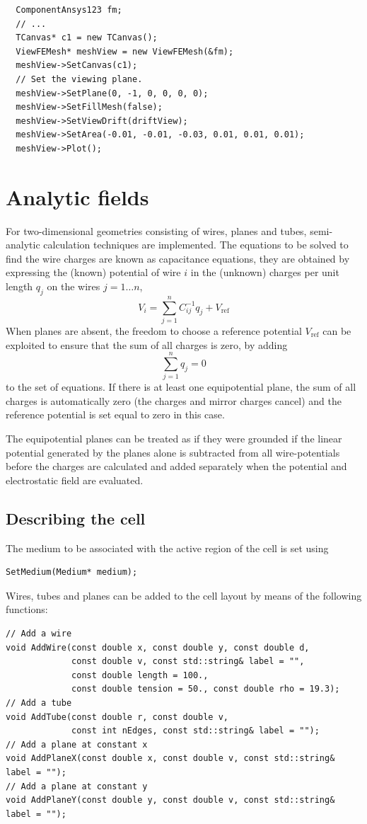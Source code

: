 \begin{lstlisting}
  ComponentAnsys123 fm;
  // ...
  TCanvas* c1 = new TCanvas();
  ViewFEMesh* meshView = new ViewFEMesh(&fm);
  meshView->SetCanvas(c1);
  // Set the viewing plane.
  meshView->SetPlane(0, -1, 0, 0, 0, 0);
  meshView->SetFillMesh(false);
  meshView->SetViewDrift(driftView);
  meshView->SetArea(-0.01, -0.01, -0.03, 0.01, 0.01, 0.01);
  meshView->Plot();
\end{lstlisting}
\section{Analytic fields}

For two-dimensional geometries consisting of wires, planes and tubes, 
semi-analytic calculation techniques are implemented. 
The equations to be solved to find the wire charges are known as 
capacitance equations, they are obtained by expressing the (known) 
potential of wire $i$ in the (unknown) charges per unit length $q_j$ 
on the wires $j = 1 \dots n$,
\begin{equation*}
V_{i} = \sum\limits_{j=1}^{n} C_{ij}^{-1}q_{j} + V_{\text{ref}} 
\end{equation*}
When planes are absent, the freedom to choose a reference potential 
$V_{\text{ref}}$ can be exploited to ensure that the sum of all 
charges is zero, by adding 
\begin{equation*}
\sum\limits_{j=1}^{n} q_{j} = 0
\end{equation*}
to the set of equations.
If there is at least one equipotential plane, the sum of all charges 
is automatically zero (the charges and mirror charges cancel) and 
the reference potential is set equal to zero in this case.

The equipotential planes can be treated as if they were grounded 
if the linear potential generated by the planes alone is subtracted 
from all wire-potentials before the charges are calculated and 
added separately when the potential and electrostatic field are evaluated.

\subsection{Describing the cell}
The medium to be associated with the active region of the cell 
is set using
\begin{lstlisting}
SetMedium(Medium* medium);
\end{lstlisting}
Wires, tubes and planes can be added to the cell layout by means of the 
following functions:
\begin{lstlisting}
// Add a wire
void AddWire(const double x, const double y, const double d,
             const double v, const std::string& label = "", 
             const double length = 100.,
             const double tension = 50., const double rho = 19.3);
// Add a tube
void AddTube(const double r, const double v, 
             const int nEdges, const std::string& label = "");
// Add a plane at constant x
void AddPlaneX(const double x, const double v, const std::string& label = "");
// Add a plane at constant y
void AddPlaneY(const double y, const double v, const std::string& label = "");
\end{lstlisting} 

